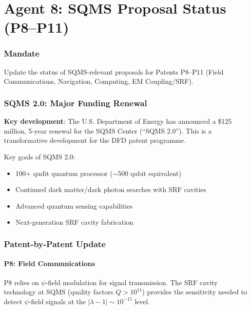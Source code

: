 \documentclass[11pt,a4paper]{article}
\begin{document}
\part{Agent 8: SQMS Proposal Status (P8--P11)}
\label{part:agent8}

\section{Mandate}

Update the status of SQMS-relevant proposals for Patents P8--P11 (Field Communications, Navigation, Computing, EM Coupling/SRF).

\section{SQMS 2.0: Major Funding Renewal}

\textbf{Key development}: The U.S. Department of Energy has announced a \$125 million, 5-year renewal for the SQMS Center (``SQMS 2.0''). This is a transformative development for the DFD patent programme.

Key goals of SQMS 2.0:
\begin{itemize}
\item 100+ qudit quantum processor ($\sim$500 qubit equivalent)
\item Continued dark matter/dark photon searches with SRF cavities
\item Advanced quantum sensing capabilities
\item Next-generation SRF cavity fabrication
\end{itemize}

\section{Patent-by-Patent Update}

\subsection{P8: Field Communications}

P8 relies on $\psi$-field modulation for signal transmission. The SRF cavity technology at SQMS (quality factors $Q > 10^{11}$) provides the sensitivity needed to detect $\psi$-field signals at the $|\lambda - 1| \sim 10^{-15}$ level.
\end{document}
